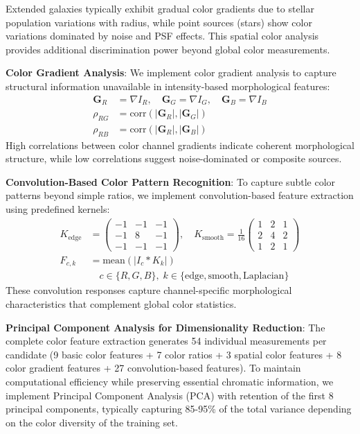 \documentclass[twocolumn,10pt]{aastex631}
\begin{document}
Extended galaxies typically exhibit gradual color gradients due to stellar population variations with radius, while point sources (stars) show color variations dominated by noise and PSF effects. This spatial color analysis provides additional discrimination power beyond global color measurements.

\textbf{Color Gradient Analysis}: We implement color gradient analysis to capture structural information unavailable in intensity-based morphological features:
\begin{align}
\mathbf{G}_R &= \nabla I_R, \quad \mathbf{G}_G = \nabla I_G, \quad \mathbf{G}_B = \nabla I_B \\
\rho_{RG} &= \text{corr}(|\mathbf{G}_R|, |\mathbf{G}_G|) \\
\rho_{RB} &= \text{corr}(|\mathbf{G}_R|, |\mathbf{G}_B|)
\end{align}
High correlations between color channel gradients indicate coherent morphological structure, while low correlations suggest noise-dominated or composite sources.

\textbf{Convolution-Based Color Pattern Recognition}: To capture subtle color patterns beyond simple ratios, we implement convolution-based feature extraction using predefined kernels:
\begin{align}
K_{\text{edge}} &= \begin{pmatrix} -1 & -1 & -1 \\ -1 & 8 & -1 \\ -1 & -1 & -1 \end{pmatrix}, \quad 
K_{\text{smooth}} = \frac{1}{16}\begin{pmatrix} 1 & 2 & 1 \\ 2 & 4 & 2 \\ 1 & 2 & 1 \end{pmatrix} \\
F_{c,k} &= \text{mean}(|I_c * K_k|) \nonumber \\
&\quad c \in \{R,G,B\}, \; k \in \{\text{edge}, \text{smooth}, \text{Laplacian}\}
\end{align}
These convolution responses capture channel-specific morphological characteristics that complement global color statistics.

\textbf{Principal Component Analysis for Dimensionality Reduction}: The complete color feature extraction generates 54 individual measurements per candidate (9 basic color features + 7 color ratios + 3 spatial color features + 8 color gradient features + 27 convolution-based features). To maintain computational efficiency while preserving essential chromatic information, we implement Principal Component Analysis (PCA) with retention of the first 8 principal components, typically capturing 85-95\% of the total variance depending on the color diversity of the training set.
\end{document}
